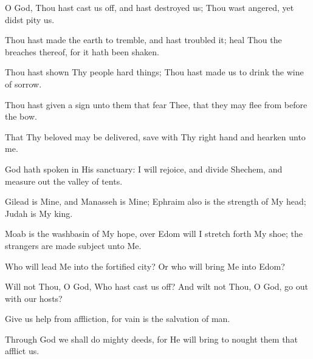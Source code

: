 O God, Thou hast cast us off, and hast destroyed us; Thou wast angered, yet didst pity us.

Thou hast made the earth to tremble, and hast troubled it; heal Thou the breaches thereof, for it hath been shaken.

Thou hast shown Thy people hard things; Thou hast made us to drink the wine of sorrow.

Thou hast given a sign unto them that fear Thee, that they may flee from before the bow.

That Thy beloved may be delivered, save with Thy right hand and hearken unto me.

God hath spoken in His sanctuary: I will rejoice, and divide Shechem, and measure out the valley of tents.

Gilead is Mine, and Manasseh is Mine; Ephraim also is the strength of My head; Judah is My king.

Moab is the washbasin of My hope, over Edom will I stretch forth My shoe; the strangers are made subject unto Me.

Who will lead Me into the fortified city? Or who will bring Me into Edom?

Will not Thou, O God, Who hast cast us off? And wilt not Thou, O God, go out with our hosts?

Give us help from affliction, for vain is the salvation of man.

Through God we shall do mighty deeds, for He will bring to nought them that afflict us.
